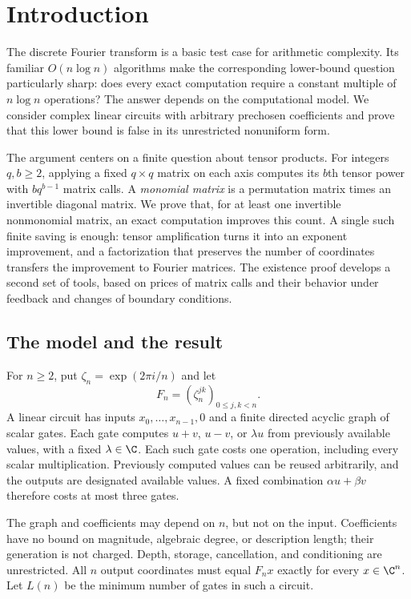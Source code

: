 \section{Introduction}\label{intro:sec:introduction}

The discrete Fourier transform is a basic test case for arithmetic
complexity. Its familiar $O(n\log n)$ algorithms make the corresponding
lower-bound question particularly sharp: does every exact computation
require a constant multiple of $n\log n$ operations? The answer depends
on the computational model. We consider complex linear circuits with
arbitrary prechosen coefficients and prove that this lower bound is
false in its unrestricted nonuniform form.

The argument centers on a finite question about tensor products.
For integers $q,b\ge2$, applying a fixed $q\times q$ matrix on each axis
computes its $b$th tensor power with $bq^{b-1}$ matrix calls.
A \emph{monomial matrix} is a permutation matrix times an invertible
diagonal matrix. We prove that, for at least one invertible nonmonomial
matrix, an exact computation improves this
count. A single such finite saving is enough: tensor amplification
turns it into an exponent improvement, and a factorization that preserves
the number of coordinates transfers the improvement to Fourier matrices.
The existence proof develops a second set of tools, based on prices of
matrix calls and their behavior under feedback and changes of boundary
conditions.

\subsection{The model and the result}

For $n\ge2$, put $\zeta_n=\exp(2\pi i/n)$ and let
\begin{equation}\label{intro:eq:fourier}
 F_n=(\zeta_n^{jk})_{0\le j,k<n}.
\end{equation}
A linear circuit has inputs $x_0,\ldots,x_{n-1},0$ and a finite directed
acyclic graph of scalar gates. Each gate computes $u+v$, $u-v$, or
$\lambda u$ from previously available values, with a fixed
$\lambda\in\C$. Each such gate costs one operation, including every
scalar multiplication. Previously computed values can be reused
arbitrarily, and the outputs are designated available values. A fixed
combination $\alpha u+\beta v$ therefore costs at most three gates.

The graph and coefficients may depend on $n$, but not on the input.
Coefficients have no bound on magnitude, algebraic degree, or description
length; their generation is not charged. Depth, storage, cancellation,
and conditioning are unrestricted. All $n$ output coordinates must equal
$F_nx$ exactly for every $x\in\C^n$. Let $L(n)$ be the minimum number of
gates in such a circuit.

